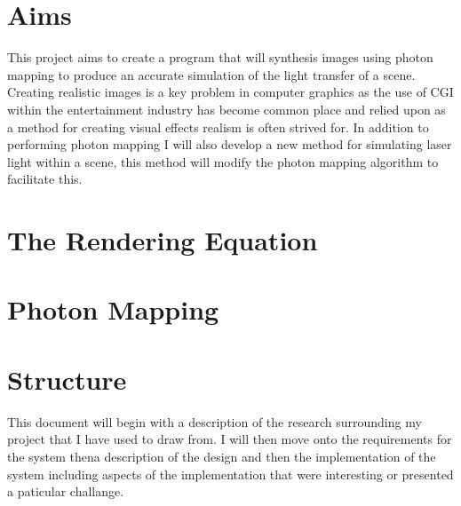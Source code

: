\section{Aims}
This project aims to create a program that will synthesis images using photon mapping to produce an accurate simulation of the
light transfer of a scene. Creating realistic images is a key problem in computer graphics as the use of CGI within the
entertainment industry has become common place and relied upon as a method for creating visual effects realism is often strived
for. In addition to performing photon mapping I will also develop a new method for simulating laser light within a scene, this
method will modify the photon mapping algorithm to facilitate this.

\section{The Rendering Equation}
\section{Photon Mapping}

\section{Structure}
This document will begin with a description of the research surrounding my project that I have used to draw from. I will then move
onto the requirements for the system thena description of the design and then the implementation of the system including
aspects of the implementation that were interesting or presented a paticular challange.
